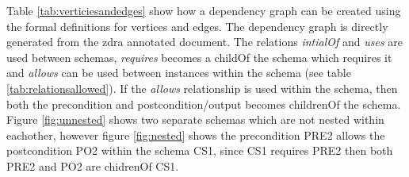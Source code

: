 
Table \ref{tab:verticiesandedges} show how a dependency graph can be created using the formal definitions for vertices and edges. The dependency graph is directly generated from the \gls{zdra} annotated document. The relations \emph{intialOf} and \emph{uses} are used between schemas, \emph{requires} becomes a childOf the schema which requires it and \emph{allows} can be used between instances within the schema (see table \ref{tab:relationsallowed}). If the \emph{allows} relationship is used within the schema, then both the precondition and postcondition/output becomes childrenOf the schema. Figure \ref{fig:unnested} shows two separate schemas which are not nested within eachother, however figure \ref{fig:nested} shows the precondition PRE2 allows the postcondition PO2 within the schema CS1, since CS1 requires PRE2 then both PRE2 and PO2 are chidrenOf CS1.

